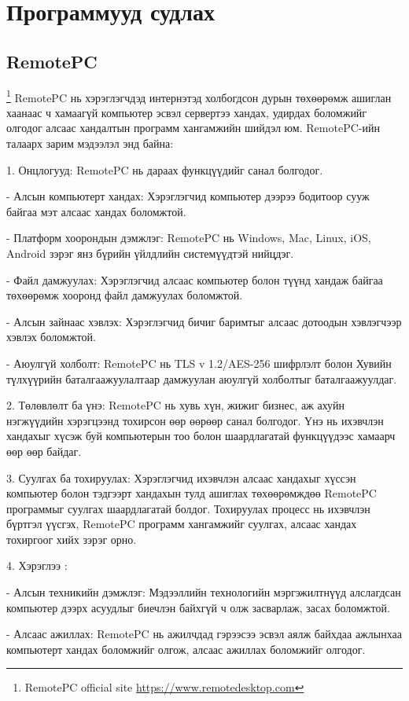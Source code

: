 \section{Программууд судлах}
\subsection{RemotePC}
\footnote{RemotePC official site \url{https://www.remotedesktop.com}}
	\quad \quad RemotePC нь хэрэглэгчдэд интернэтэд холбогдсон дурын төхөөрөмж ашиглан хаанаас ч хамаагүй компьютер эсвэл сервертээ хандах, удирдах боломжийг олгодог алсаас хандалтын программ хангамжийн шийдэл юм. RemotePC-ийн талаарх зарим мэдээлэл энд байна:

1. Онцлогууд: RemotePC нь дараах функцүүдийг санал болгодог.

- Алсын компьютерт хандах: Хэрэглэгчид компьютер дээрээ бодитоор сууж байгаа мэт алсаас хандах боломжтой.
 
- Платформ хоорондын дэмжлэг: RemotePC нь Windows, Mac, Linux, iOS, Android зэрэг янз бүрийн үйлдлийн системүүдтэй нийцдэг.

- Файл дамжуулах: Хэрэглэгчид алсаас компьютер болон түүнд хандаж байгаа төхөөрөмж хооронд файл дамжуулах боломжтой.

- Алсын зайнаас хэвлэх: Хэрэглэгчид бичиг баримтыг алсаас дотоодын хэвлэгчээр хэвлэх боломжтой.

- Аюулгүй холболт: RemotePC нь TLS v 1.2/AES-256 шифрлэлт болон Хувийн түлхүүрийн баталгаажуулалтаар дамжуулан аюулгүй холболтыг баталгаажуулдаг.

2. Төлөвлөлт ба үнэ: RemotePC нь хувь хүн, жижиг бизнес, аж ахуйн нэгжүүдийн хэрэгцээнд тохирсон өөр өөрөөр санал болгодог. Үнэ нь ихэвчлэн хандахыг хүсэж буй компьютерын тоо болон шаардлагатай функцүүдээс хамаарч өөр өөр байдаг.

3. Суулгах ба тохируулах: Хэрэглэгчид ихэвчлэн алсаас хандахыг хүссэн компьютер болон тэдгээрт хандахын тулд ашиглах төхөөрөмждөө RemotePC программыг суулгах шаардлагатай болдог. Тохируулах процесс нь ихэвчлэн бүртгэл үүсгэх, RemotePC программ хангамжийг суулгах, алсаас хандах тохиргоог хийх зэрэг орно.

4. Хэрэглээ : 

- Алсын техникийн дэмжлэг: Мэдээллийн технологийн мэргэжилтнүүд алслагдсан компьютер дээрх асуудлыг биечлэн байхгүй ч олж засварлаж, засах боломжтой.

- Алсаас ажиллах: RemotePC нь ажилчдад гэрээсээ эсвэл аялж байхдаа ажлынхаа компьютерт хандах боломжийг олгож, алсаас ажиллах боломжийг олгодог.

